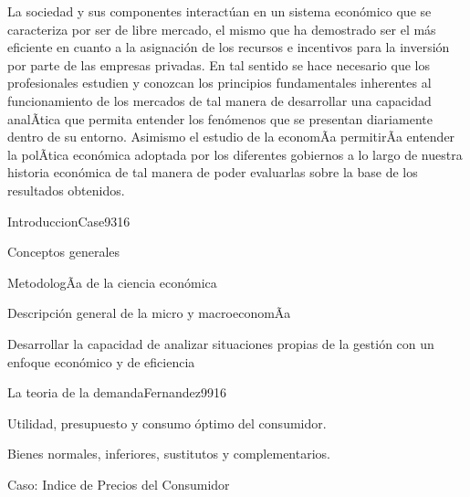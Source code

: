 \begin{syllabus}


\begin{justification}
La sociedad y sus componentes interactúan en un sistema económico que se caracteriza por ser de libre mercado, el mismo que ha demostrado ser el más eficiente en cuanto a la asignación de los recursos e incentivos para la inversión por parte de las empresas privadas. En tal sentido se hace necesario que los profesionales estudien y conozcan los principios fundamentales inherentes al funcionamiento de los mercados de tal manera de desarrollar una capacidad analÃ­tica que permita entender los fenómenos que se presentan diariamente dentro de su entorno. Asimismo el estudio de la economÃ­a permitirÃ­a entender la polÃ­tica económica adoptada por los diferentes gobiernos a lo largo de nuestra historia económica de tal manera de poder evaluarlas sobre la base de los resultados obtenidos.
\end{justification}

\begin{goals}
\item \OutcomeHU
\end{goals}

\begin{outcomes}
\end{outcomes}

\begin{unit}{Introduccion}{Case93}{16}
\begin{topics}
	\item Conceptos generales
	\item MetodologÃ­a de la ciencia económica
	\item Descripción general de la micro y macroeconomÃ­a
\end{topics}

\begin{unitgoals}
      \item Desarrollar la capacidad de analizar situaciones propias de la gestión con un enfoque económico y de eficiencia
   \end{unitgoals}
\end{unit}

\begin{unit}{La teoria de la demanda}{Fernandez99}{16}
\begin{topics}
	\item  Utilidad, presupuesto y consumo óptimo del consumidor.
	\item Bienes normales, inferiores, sustitutos y complementarios.
 	\item Caso: Indice de Precios del Consumidor
\end{topics}


\end{unit}
\end{syllabus}
